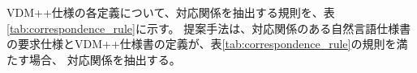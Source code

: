 \documentclass[a4j,twocolumn,10pt]{jceee-kyushu-euc}
\begin{document}
VDM++仕様の各定義について、対応関係を抽出する規則を、表\ref{tab:correspondence_rule}に示す。
提案手法は、対応関係のある自然言語仕様書の要求仕様とVDM++仕様書の定義が、表\ref{tab:correspondence_rule}の規則を満たす場合、
対応関係を抽出する。

\end{document}
